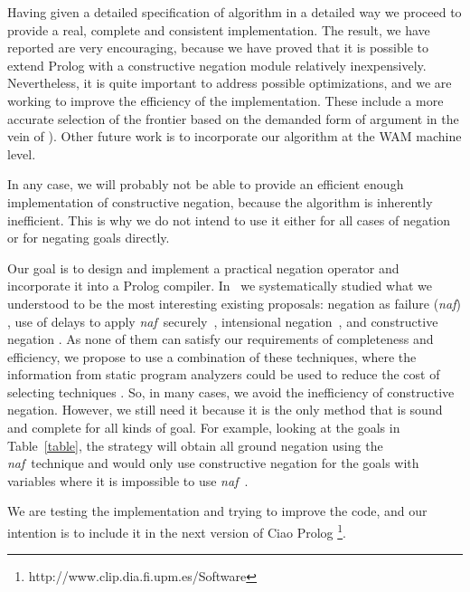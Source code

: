 \documentclass{llncs}
\newcommand{\naf}{{\em naf}}\newcommand{\viejo}[1]{}
\begin{document}
Having given a detailed specification of algorithm in a detailed way
we proceed to provide a real, complete and consistent
implementation. The result, we have reported are very encouraging,
because we have proved that it is possible to extend Prolog with a
constructive negation module relatively inexpensively. Nevertheless,
it is quite important to address possible optimizations, and we are
working to improve the efficiency of the implementation. These include
a more accurate selection of the frontier based on the demanded form
of argument in the vein of \cite{Moreno2}). Other future work is to
incorporate our algorithm at the WAM machine level.

In any case, we will probably not be able to provide an efficient enough
implementation of constructive negation, because the algorithm is
inherently inefficient.  This is why we do not intend to
use it either for all cases of negation or for negating goals
directly.

Our goal is to design and implement a practical negation operator and
incorporate it into a Prolog compiler.
In~\cite{SusanaPADL2000,SusanaLPAR01} we systematically studied what
we understood to be the most interesting existing proposals: negation
as failure (\naf) \cite{Clark}, use of delays to apply \naf\
securely~\cite{naish:lncs}, intensional
negation~\cite{Barbuti1,Barbuti2}, and constructive negation
\cite{Chan1,Chan2,Drabent,Stuckey,Stuckey95}. As none of them can
satisfy our requirements of completeness and efficiency, we propose to
use a combination of these techniques, where the information from
static program analyzers could be used to reduce the cost of selecting
techniques \cite{SusanaLPAR01}. So, in many cases, we avoid the
inefficiency of constructive negation. However, we still need it
because it is the only method that is sound and complete for all kinds
of goal. For example, looking at the goals in Table~\ref{table}, the
strategy will obtain all ground negation using the \naf\ technique and
would only use constructive negation for the goals with variables
where it is impossible to use \naf\ .

We are testing the implementation and trying to improve the code, and
our intention is to include it in the next version of Ciao Prolog
\footnote{http://www.clip.dia.fi.upm.es/Software}.
  


 \begin{small}

     
    

 \end{small}


\end{document}

